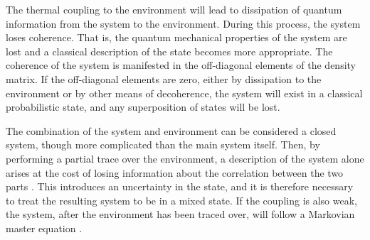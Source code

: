 The thermal coupling to the environment will lead to dissipation of quantum information from the system to the environment. During this process, the system loses coherence. That is, the quantum mechanical properties of the system are lost and a classical description of the state becomes more appropriate. The coherence of the system is manifested in the off-diagonal elements of the density matrix. If the off-diagonal elements are zero, either by dissipation to the environment or by other means of decoherence, the system will exist in a classical probabilistic state, and any superposition of states will be lost. \cite{Annby-Andersson:2024}

The combination of the system and environment can be considered a closed system, though more complicated than the main system itself. Then, by performing a partial trace over the environment, a description of the system alone arises at the cost of losing information about the correlation between the two parts \cite{Annby-Andersson:2024}. This introduces an uncertainty in the state, and it is therefore necessary to treat the resulting system to be in a mixed state. If the coupling is also weak, the system, after the environment has been traced over, will follow a Markovian master equation \cite{Annby-Andersson:2024}.

